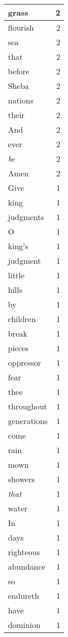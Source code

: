 \begin{center}
\begin{longtable}{l|r}
grass & 2\\ \hline 
flourish & 2\\ \hline 
sea & 2\\ \hline 
that & 2\\ \hline 
before & 2\\ \hline 
Sheba & 2\\ \hline 
nations & 2\\ \hline 
their & 2\\ \hline 
And & 2\\ \hline 
ever & 2\\ \hline 
\emph{be} & 2\\ \hline 
Amen & 2\\ \hline 
Give & 1\\ \hline 
king & 1\\ \hline 
judgments & 1\\ \hline 
O & 1\\ \hline 
king's & 1\\ \hline 
judgment & 1\\ \hline 
little & 1\\ \hline 
hills & 1\\ \hline 
by & 1\\ \hline 
children & 1\\ \hline 
break & 1\\ \hline 
pieces & 1\\ \hline 
oppressor & 1\\ \hline 
fear & 1\\ \hline 
thee & 1\\ \hline 
throughout & 1\\ \hline 
generations & 1\\ \hline 
come & 1\\ \hline 
rain & 1\\ \hline 
mown & 1\\ \hline 
showers & 1\\ \hline 
\emph{that} & 1\\ \hline 
water & 1\\ \hline 
In & 1\\ \hline 
days & 1\\ \hline 
righteous & 1\\ \hline 
abundance & 1\\ \hline 
so & 1\\ \hline 
endureth & 1\\ \hline 
have & 1\\ \hline 
dominion & 1\\ \hline 

\end{longtable}
\end{center}
